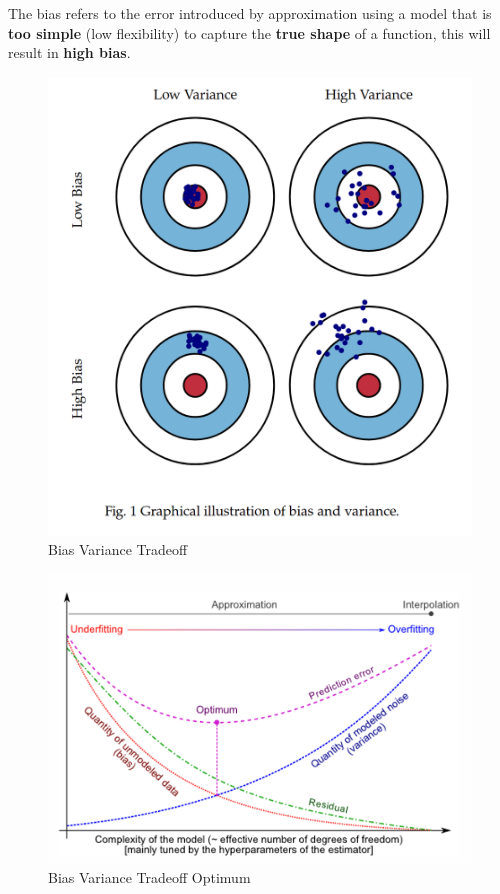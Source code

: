 \documentclass[../Main.tex]{subfiles}
\begin{document}
The bias refers to the error introduced by approximation using a model that is \textbf{too simple} (low flexibility)
to capture the \textbf{true shape} of a function, this will result in \textbf{high bias}.

\begin{figure}[H]
    \centering
    \includegraphics[width=0.5\linewidth]{Images/bias-variance-tradeoff.png}
    \caption{Bias Variance Tradeoff}
\end{figure}
\begin{figure}[H]
    \centering
    \includegraphics[width=0.75\linewidth]{Images/bias-variance-optimum.png}
    \caption{Bias Variance Tradeoff Optimum}
\end{figure}
\end{document}
